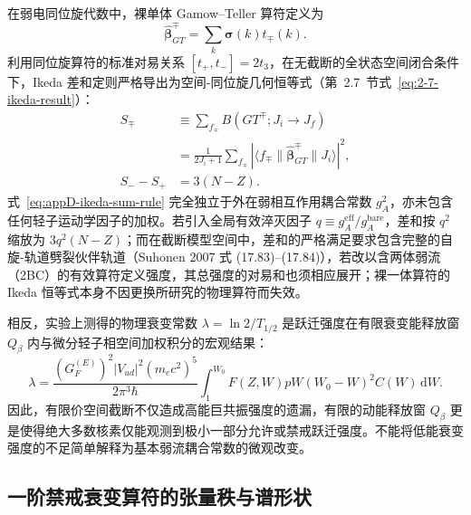 在弱电同位旋代数中，裸单体 Gamow--Teller 算符定义为
\[
\hat{\boldsymbol\beta}_{GT}^{\mp}=\sum_k\boldsymbol\sigma(k)t_\mp(k).
\]
利用同位旋算符的标准对易关系 $[t_+, t_-] = 2 t_3$，在无截断的全状态空间闭合条件下，Ikeda 差和定则严格导出为空间-同位旋几何恒等式（第~2.7~节式~\eqref{eq:2-7-ikeda-result}）：
\begin{equation}\label{eq:appD-ikeda-sum-rule}
\begin{aligned}
S_\mp&\equiv\sum_{f_\mp}B(GT^\mp;J_i\to J_f)\\
&=\frac{1}{2J_i+1}\sum_{f_\mp}|\langle f_\mp\|\hat{\boldsymbol\beta}_{GT}^{\mp}\|J_i\rangle|^2,\\
S_--S_+&=3(N-Z).
\end{aligned}
\end{equation}
式~\eqref{eq:appD-ikeda-sum-rule} 完全独立于外在弱相互作用耦合常数 $g_A^2$，亦未包含任何轻子运动学因子的加权。若引入全局有效淬灭因子 $q \equiv g_A^{\mathrm{eff}} / g_A^{\mathrm{bare}}$，差和按 $q^2$ 缩放为 $3 q^2 (N - Z)$；而在截断模型空间中，差和的严格满足要求包含完整的自旋-轨道劈裂伙伴轨道（Suhonen 2007 式 (17.83)–(17.84)），若改以含两体弱流（2BC）的有效算符定义强度，其总强度的对易和也须相应展开；裸一体算符的 Ikeda 恒等式本身不因更换所研究的物理算符而失效。

相反，实验上测得的物理衰变常数 $\lambda = \ln 2 / T_{1/2}$ 是跃迁强度在有限衰变能释放窗 $Q_\beta$ 内与微分轻子相空间加权积分的宏观结果：
\begin{equation}\label{eq:appD-lambda-phase-space}
\lambda = \frac{(G_F^{(E)})^2 |V_{ud}|^2 (m_e c^2)^5}{2\pi^3 \hbar} \int_1^{W_0} F(Z, W) p W (W_0 - W)^2 C(W) \, \mathrm{d}W.
\end{equation}
因此，有限价空间截断不仅造成高能巨共振强度的遗漏，有限的动能释放窗 $Q_\beta$ 更是使得绝大多数核素仅能观测到极小一部分允许或禁戒跃迁强度。不能将低能衰变强度的不足简单解释为基本弱流耦合常数的微观改变。

\subsection{一阶禁戒衰变算符的张量秩与谱形状}

